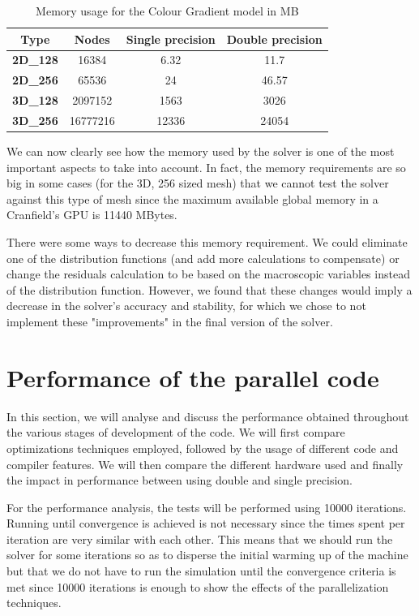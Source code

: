 \documentclass[12pt, openany]{book}
\begin{document}
\begin{table}[H]
	\centering
	\begin{tabular}{|c|c|c|c|}
		\hline
		\textbf{Type}    & \textbf{Nodes} & \textbf{Single precision} & \textbf{Double precision} \\ \hline
		\textbf{2D\_128} & 16384          & 6.32                      & 11.7                      \\ \hline
		\textbf{2D\_256} & 65536          & 24                        & 46.57                     \\ \hline
		\textbf{3D\_128} & 2097152        & 1563                      & 3026                      \\ \hline
		\textbf{3D\_256} & 16777216       & 12336                     & 24054                     \\ \hline
	\end{tabular}
	\caption{Memory usage for the Colour Gradient model in MB}
	\label{tab:memCG}
\end{table}

We can now clearly see how the memory used by the solver is one of the most important aspects to take into account. In fact, the memory requirements are so big in some cases (for the 3D, 256 sized mesh) that we cannot test the solver against this type of mesh since the maximum available global memory in a Cranfield's GPU is 11440 MBytes. \par
There were some ways to decrease this memory requirement. We could eliminate one of the distribution functions (and add more calculations to compensate) or change the residuals calculation to be based on the macroscopic variables instead of the distribution function. However, we found that these changes would imply a decrease in the solver's accuracy and stability, for which we chose to not implement these "improvements" in the final version of the solver.

\section{Performance of the parallel code}\label{sec:performance}
In this section, we will analyse and discuss the performance obtained throughout the various stages of development of the code. We will first compare optimizations techniques employed, followed by the usage of different code and compiler features. We will then compare the different hardware used and finally the impact in performance between using double and single precision. \par
For the performance analysis, the tests will be performed using 10000 iterations. Running until convergence is achieved is not necessary since the times spent per iteration are very similar with each other. This means that we should run the solver for some iterations so as to disperse the initial warming up of the machine but that we do not have to run the simulation until the convergence criteria is met since 10000 iterations is enough to show the effects of the parallelization techniques.
\end{document}
